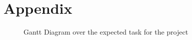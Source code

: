 \documentclass[a4paper,8pt]{article}
\begin{document}
	\section{Appendix}
	\begin{figure}[!h]
		\begin{center}
		\end{center}
		\caption{Gantt Diagram over the expected task for the project}
		\label{img:Gantt}
	\end{figure}
\end{document}

